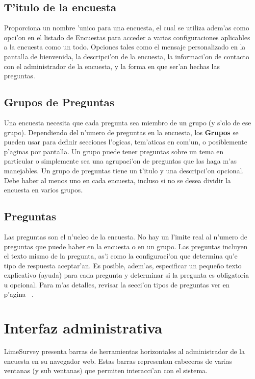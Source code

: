 \documentclass[12pt,spanish]{report}
\begin{document}
\subsection{T'itulo de la encuesta}
\label{'titulo_encuesta'}
Proporciona un nombre 'unico para una encuesta, el cual se utiliza adem'as como opci'on en el listado de Encuestas para acceder a varias configuraciones aplicables a la encuesta como un todo. Opciones tales como el mensaje personalizado en la pantalla de bienvenida, la descripci'on de la encuesta, la informaci'on de contacto con el administrador de la encuesta, y la forma en que ser'an hechas las preguntas.


\subsection{Grupos de Preguntas}
\label{'grupo_preguntas'}
Una encuesta necesita que cada pregunta sea miembro de un grupo (y s'olo de ese grupo). Dependiendo del n'umero de preguntas en la encuesta, los {\bf Grupos} se pueden usar para definir secciones l'ogicas, tem'aticas en com'un, o posiblemente p'aginas por pantalla. Un grupo puede tener preguntas sobre un tema en particular o simplemente sea una agrupaci'on de preguntas que las haga m'as manejables.
Un grupo de preguntas tiene un t'itulo y una descripci'on opcional. Debe haber al menos uno en cada encuesta, incluso si no se desea dividir la encuesta en varios grupos.


\subsection{Preguntas}
\label{'preguntas'}
Las preguntas son el n'ucleo de la encuesta. No hay un l'imite real al n'umero de preguntas que puede haber en la encuesta o en un grupo. Las preguntas incluyen el texto mismo de la pregunta, as'i como la configuraci'on que determina qu'e tipo de respuesta aceptar'an. Es posible, adem'as, especificar un pequeño texto explicativo (ayuda) para cada pregunta y determinar si la pregunta es obligatoria u opcional. Para m'as detalles, revisar la secci'on tipos de preguntas ver en p'agina ~\pageref{'tipos_preguntas'}.

\newpage

\section{Interfaz administrativa}
LimeSurvey presenta barras de herramientas horizontales al administrador de la encuesta en su navegador web. Estas barras representan cabeceras de varias ventanas (y sub ventanas) que permiten interacci'an con el sistema.
\end{document}
